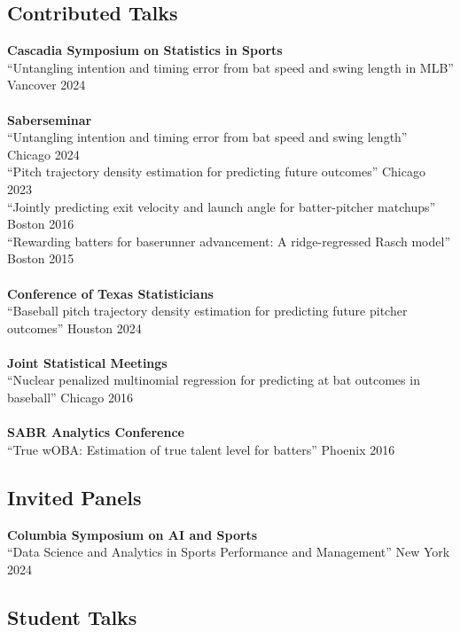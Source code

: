 \documentclass{article}
\begin{document}
\subsection*{\sc Contributed Talks}

{\bf Cascadia Symposium on Statistics in Sports}\\
``Untangling intention and timing error from bat speed and swing length in MLB'' \hfill Vancover 2024\\
~\\
{\bf Saberseminar}\\
``Untangling intention and timing error from bat speed and swing length'' \hfill Chicago 2024\\
``Pitch trajectory density estimation for predicting future outcomes'' \hfill Chicago 2023\\
``Jointly predicting exit velocity and launch angle for batter-pitcher matchups'' \hfill Boston 2016\\
``Rewarding batters for baserunner advancement: A ridge-regressed Rasch model'' \hfill Boston 2015\\
~\\
{\bf Conference of Texas Statisticians}\\
``Baseball pitch trajectory density estimation for predicting future pitcher outcomes'' \hfill Houston 2024\\
~\\
{\bf Joint Statistical Meetings}\\
``Nuclear penalized multinomial regression for predicting at bat outcomes in baseball'' \hfill Chicago 2016\\
~\\
{\bf SABR Analytics Conference}\\
``True wOBA: Estimation of true talent level for batters'' \hfill Phoenix 2016

\subsection*{\sc Invited Panels}

{\bf Columbia Symposium on AI and Sports}\\
``Data Science and Analytics in Sports Performance and Management'' \hfill New York 2024

\subsection*{\sc Student Talks}
\end{document}

